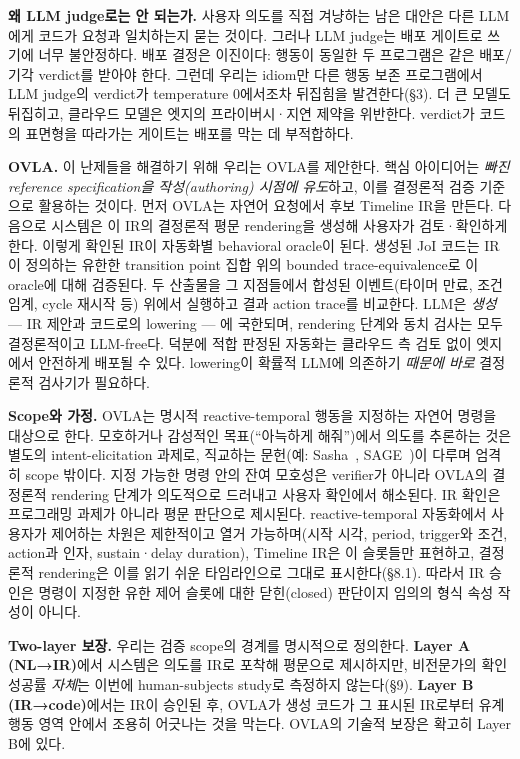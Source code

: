 \documentclass[sigconf,nonacm,anonymous,review]{acmart}
\begin{document}
\textbf{왜 LLM judge로는 안 되는가.} 사용자 의도를 직접 겨냥하는 남은 대안은 다른 LLM에게 코드가 요청과 일치하는지 묻는 것이다. 그러나 LLM judge는 배포 게이트로 쓰기에 너무 불안정하다. 배포 결정은 이진이다: 행동이 동일한 두 프로그램은 같은 배포/기각 verdict를 받아야 한다. 그런데 우리는 idiom만 다른 행동 보존 프로그램에서 LLM judge의 verdict가 temperature 0에서조차 뒤집힘을 발견한다(\S3). 더 큰 모델도 뒤집히고, 클라우드 모델은 엣지의 프라이버시·지연 제약을 위반한다. verdict가 코드의 표면형을 따라가는 게이트는 배포를 막는 데 부적합하다.

\textbf{OVLA.} 이 난제들을 해결하기 위해 우리는 OVLA를 제안한다. 핵심 아이디어는 \emph{빠진 reference specification을 작성(authoring) 시점에 유도}하고, 이를 결정론적 검증 기준으로 활용하는 것이다. 먼저 OVLA는 자연어 요청에서 후보 Timeline IR을 만든다. 다음으로 시스템은 이 IR의 결정론적 평문 rendering을 생성해 사용자가 검토·확인하게 한다. 이렇게 확인된 IR이 자동화별 behavioral oracle이 된다. 생성된 JoI 코드는 IR이 정의하는 유한한 transition point 집합 위의 bounded trace-equivalence로 이 oracle에 대해 검증된다. 두 산출물을 그 지점들에서 합성된 이벤트(타이머 만료, 조건 임계, cycle 재시작 등) 위에서 실행하고 결과 action trace를 비교한다. LLM은 \emph{생성} — IR 제안과 코드로의 lowering — 에 국한되며, rendering 단계와 동치 검사는 모두 결정론적이고 LLM-free다. 덕분에 적합 판정된 자동화는 클라우드 측 검토 없이 엣지에서 안전하게 배포될 수 있다. lowering이 확률적 LLM에 의존하기 \emph{때문에 바로} 결정론적 검사기가 필요하다.

\textbf{Scope와 가정.}
OVLA는 명시적 reactive-temporal 행동을 지정하는 자연어 명령을 대상으로 한다. 모호하거나 감성적인 목표(``아늑하게 해줘'')에서 의도를 추론하는 것은 별도의 intent-elicitation 과제로, 직교하는 문헌(예: Sasha~\cite{sasha}, SAGE~\cite{sage})이 다루며 엄격히 scope 밖이다. 지정 가능한 명령 안의 잔여 모호성은 verifier가 아니라 OVLA의 결정론적 rendering 단계가 의도적으로 드러내고 사용자 확인에서 해소된다.
IR 확인은 프로그래밍 과제가 아니라 평문 판단으로 제시된다. reactive-temporal 자동화에서 사용자가 제어하는 차원은 제한적이고 열거 가능하며(시작 시각, period, trigger와 조건, action과 인자, sustain·delay duration), Timeline IR은 이 슬롯들만 표현하고, 결정론적 rendering은 이를 읽기 쉬운 타임라인으로 그대로 표시한다(\S8.1). 따라서 IR 승인은 명령이 지정한 유한 제어 슬롯에 대한 닫힌(closed) 판단이지 임의의 형식 속성 작성이 아니다.

\textbf{Two-layer 보장.} 우리는 검증 scope의 경계를 명시적으로 정의한다.
\textbf{Layer A (NL→IR)}에서 시스템은 의도를 IR로 포착해 평문으로 제시하지만, 비전문가의 확인 성공률 \emph{자체}는 이번에 human-subjects study로 측정하지 않는다(\S9). \textbf{Layer B (IR→code)}에서는 IR이 승인된 후, OVLA가 생성 코드가 그 표시된 IR로부터 유계 행동 영역 안에서 조용히 어긋나는 것을 막는다. OVLA의 기술적 보장은 확고히 Layer B에 있다.
\end{document}
